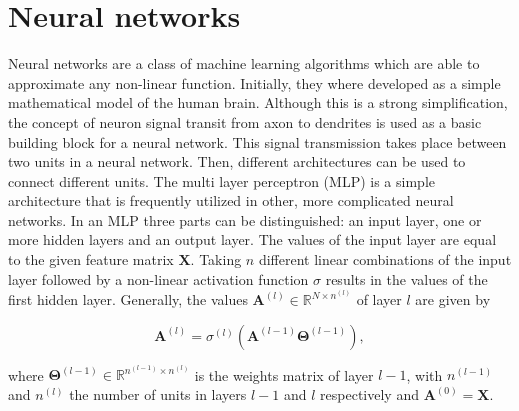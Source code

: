 \section{Neural networks}


Neural networks are a class of machine learning algorithms which are able to
approximate any non-linear function.\cite{} Initially, they where developed as
a simple mathematical model of the human brain. Although this is a strong
simplification, the concept of neuron signal transit from axon to dendrites
is used as a basic building block for a neural network. This signal transmission
takes place between two units in a neural network. Then, different architectures
can be used to connect different units. The multi layer perceptron (MLP) is a simple
architecture that is frequently utilized in other, more complicated neural networks.
In an MLP three parts can be distinguished: an input layer, one or more hidden layers
and an output layer. The values of the input layer are equal to the given feature matrix
$\pmb{X}$. Taking $n$ different linear combinations of the input layer followed by
a non-linear activation function $\sigma$ results in the values of the first hidden
layer. Generally, the values $\pmb{A}^{(l)} \in \mathbb{R}^{N \times n^{(l)}}$ of layer
$l$ are given by


\begin{equation}
	\pmb{A}^{(l)} =  \sigma^{(l)} \left(\pmb{A}^{(l-1)}\pmb{\Theta}^{(l-1)} \right),
\end{equation}


where $\pmb{\Theta}^{(l-1)} \in \mathbb{R}^{n^{(l-1)} \times n^{(l)}}$ is the weights matrix
of layer $l - 1$, with $n^{(l-1)}$ and $n^{(l)}$ the number of units in layers
$l-1$ and $l$ respectively and $\pmb{A}^{(0)} = \pmb{X}$.

